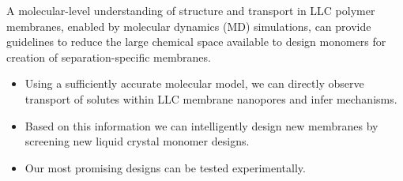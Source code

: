 \documentclass{article}
\begin{document}
  A molecular-level understanding of structure and transport in LLC polymer 
  membranes, enabled by molecular dynamics (MD) simulations, can provide 
  guidelines to reduce the large chemical space available to design
  monomers for creation of separation-specific membranes. 
  \begin{itemize}
    \item Using a sufficiently accurate molecular model, we can directly 
    observe transport of solutes within LLC membrane nanopores and infer
    mechanisms. 
    \item Based on this information 
we can intelligently design new membranes
    by screening new liquid crystal monomer designs.
    \item Our most promising designs can be tested experimentally.
  \end{itemize}
  
\end{document}
